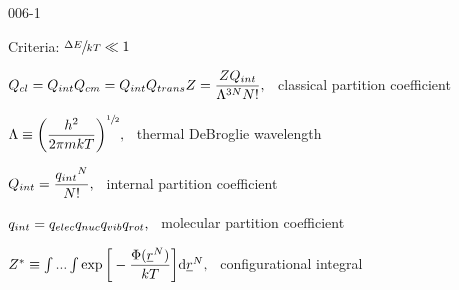 \begin{mitframe}{006-1} %

    
\begin{listone}
    
    \item Criteria: $\sfrac{\iipf\energy}{\thermcond\Temp} \ll 1$
    
    
    \item $ \cpc = \ipc\cmpc = \ipc \heatflow_{trans} \compress = \dfrac{\compress\ipc}{\debroglie^{3N}\nummoles!},$ ~classical partition coefficient 
    
    
    \begin{listtwo}
    
    	\item $\debroglie \equiv \bigg(\dfrac{\planck^2}{2\pie\mass\thermcond\Temp}\bigg)^{\sfrac{1}{2}},$ ~thermal DeBroglie wavelength
        
  
    	\item $\ipc = \dfrac{{\impc}^{\nummoles}}{\nummoles!} ,$ ~internal partition coefficient
        
        \begin{listthree}
    
    		\item $\impc = \empc\nmpc\vmpc\rmpc ,$ ~molecular partition coefficient
    
    	\end{listthree}
    
    	\item $\configint \equiv \int...\int\exp\bigg[-\dfrac{\pot(\uline{\pos}^{\nummoles})}{\thermcond\Temp}\bigg]\mathrm{d}\uline{\pos}^{\nummoles} ,$ ~configurational integral
    
    
    
    
    \end{listtwo}
    
\end{listone}
    
\end{mitframe}